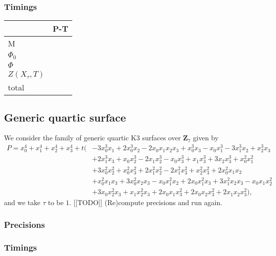 \documentclass[a4paper,11pt]{article}
\numberwithin{equation}{section}
\newcommand{\ZZ}{\mathbf{Z}} %
\theoremstyle{definition}
\begin{document}
\subsubsection{Timings}

\begin{tabular}{l|l}
                 & \mbox{P-T}        \\
\hline                 
M                &                   \\
\hline                 
$\Phi_0$         &                   \\
\hline                 
$\Phi$           &                   \\
\hline
$Z(X_{\tau},T)$  &                   \\
\hline
total            &                   \\
\end{tabular}

\subsection{Generic quartic surface}

We consider the family of generic quartic K3 surfaces over $\ZZ_{7}$ given by 
\begin{equation*}
\begin{split}
P=x_0^4 + x_1^4 + x_2^4 + x_3^4 
+ t \bigl( & -3 x_0^3 x_1 + 2 x_0^3 x_2 - 2 x_0 x_1 x_2 x_3 + x_0^3 x_3 - x_0 x_1^3 - 3 x_1^3 x_2 + x_2^3 x_3 \\ &
          + 2 x_1^3 x_3 + x_0 x_2^3 - 2 x_1 x_2^3 - x_0 x_3^3 + x_1 x_3^3 + 3 x_2 x_3^3 + x_0^2 x_1^2 \\ & 
          + 3 x_0^2 x_2^2 + x_0^2 x_3^2 + 2 x_1^2 x_2^2 - 2 x_1^2 x_3^2 + x_2^2 x_3^2 
          + 2 x_0^2 x_1 x_2 \\ & + x_0^2 x_1 x_3 + 3 x_0^2 x_2 x_3 - x_0 x_1^2 x_2 + 2 x_0 x_1^2 x_3 
          + 3 x_1^2 x_2 x_3 - x_0 x_1 x_2^2 \\ & 
          + 3 x_0 x_2^2 x_3 + x_1 x_2^2 x_3 + 2 x_0 x_1 x_3^2 + 2 x_0 x_2 x_3^2 + 2 x_1 x_2 x_3^2 \bigr),
\end{split}
\end{equation*}
and we take $\tau$ to be  $1$. [[TODO]] (Re)compute precisions and run again.

\subsubsection{Precisions}

\subsubsection{Timings}
\end{document}
